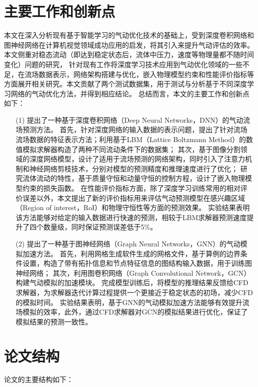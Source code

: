 \section{主要工作和创新点}
本文在深入分析现有基于智能学习的气动优化技术的基础上，受到深度卷积网络和图神经网络在计算机视觉领域成功应用的启发，将其引入来提升气动评估的效率。
本文侧重对稳态流动（即达到稳定状态后，流体中压力，速度等物理量都不随时间变化）问题的研究，
针对现有工作将深度学习技术应用到气动优化领域的一些不足，在流场数据表示，网络架构搭建与优化，嵌入物理模型约束和性能评价指标等方面展开相关研究。本文贡献了两个测试数据集，用于测试与分析基于不同深度学习网络的气动优化方法，并得到相应结论。
总结而言，本文的主要工作和创新点如下：
\begin{itemize}
	\item[(1)] 提出了一种基于深度卷积网络（Deep Neural Networks，DNN）的气动流场预测方法。
	首先，针对深度网络的输入数据的表示问题，提出了针对流场流场数据的特征表示方法；利用基于LBM（Lattice Boltzmann Method）的数值模拟求解器构造了两种不同流动条件下的数据集；
	其次，基于图像分割领域的深度网络模型，设计了适用于流场预测的网络架构，同时引入了注意力机制和神经网络剪枝技术，分别对模型的预测精度和推理速度进行了优化；
	研究流体流动的特性，基于质量守恒和动量守恒的控制方程，设计了嵌入物理模型约束的损失函数。
	在性能评价指标方面，除了深度学习训练常用的相对评价误差以外，本文提出了新的评价指标用来评估气动预测模型在感兴趣区域（Region of  interest，RoI）和物理守恒性等方面的预测效果。
	实验结果表明该方法能够对给定的输入数据进行快速的预测，相较于LBM求解器预测速度提升了四个数量级，同时保证预测误差低于5\%。
		
	
	\item[(2)] 提出了一种基于图神经网络（Graph Neural  Networks，GNN）的气动模拟加速方法。
	首先，利用网格生成软件生成的网格文件，基于算例的边界条件设置，构造了带有拓扑信息和节点特征信息的图结构输入数据，用于训练图神经网络；
	其次，利用图卷积网络（Graph  Convolutional Network，GCN）构建气动模拟的加速模块。
	完成模型训练后，将模型的推理结果反馈给CFD求解器，为求解器迭代计算过程提供一个更接近于稳定状态的初场，减少CFD的模拟时间。
	实验结果表明，基于GNN的气动模拟加速方法能够有效提升流场模拟的效率，此外，通过CFD求解器对GCN的模拟结果进行优化，保证了模拟结果的预测一致性。
	
	
	
	
\end{itemize}

\section{论文结构}
论文的主要结构如下：


